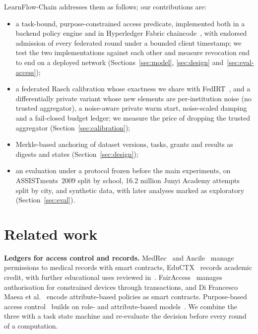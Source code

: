 \documentclass[pdflatex,iicol,sn-mathphys-num]{sn-jnl}
\theoremstyle{thmstyleone}
\newcommand{\JunyiRawRowsM}{16.2}
\begin{document}
LearnFlow-Chain addresses them as follows; our contributions are:
\begin{itemize}
\item a task-bound, purpose-constrained access predicate, implemented both in a backend policy engine and in Hyperledger Fabric chaincode~\cite{androulaki2018hyperledger}, with endorsed admission of every federated round under a bounded client timestamp; we test the two implementations against each other and measure revocation end to end on a deployed network (Sections~\ref{sec:model}, \ref{sec:design} and~\ref{sec:eval-access});
\item a federated Rasch calibration whose exactness we share with FedIRT~\cite{zhou2025federated}, and a differentially private variant whose new elements are per-institution noise (no trusted aggregator), a noise-aware private warm start, noise-scaled damping and a fail-closed budget ledger; we measure the price of dropping the trusted aggregator (Section~\ref{sec:calibration});
\item Merkle-based anchoring of dataset versions, tasks, grants and results as digests and states (Section~\ref{sec:design});
\item an evaluation under a protocol frozen before the main experiments, on ASSISTments~2009 split by school, \JunyiRawRowsM{} million Junyi Academy attempts split by city, and synthetic data, with later analyses marked as exploratory (Section~\ref{sec:eval}).
\end{itemize}

\section{Related work}\label{sec:related}

\textbf{Ledgers for access control and records.} MedRec~\cite{azaria2016medrec} and Ancile~\cite{dagher2018ancile} manage permissions to medical records with smart contracts, EduCTX~\cite{turkanovic2018eductx} records academic credit, with further educational uses reviewed in~\cite{alammary2019blockchain}. FairAccess~\cite{ouaddah2016fairaccess} manages authorisation for constrained devices through transactions, and Di Francesco Maesa et al.~\cite{difrancescomaesa2019blockchain} encode attribute-based policies as smart contracts. Purpose-based access control~\cite{byun2008purpose} builds on role- and attribute-based models~\cite{sandhu1996role,hu2014guide}. We combine the three with a task state machine and re-evaluate the decision before every round of a computation.
\end{document}
